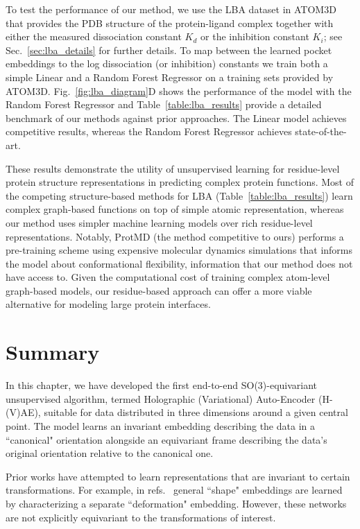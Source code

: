 To test the performance of our method, we use the LBA dataset in
ATOM3D~\cite{townshend_atom3d_2021} that provides the PDB structure of the protein-ligand complex
together with   either the measured dissociation constant $K_d$ or the inhibition constant $K_i$;
see Sec.~\ref{sec:lba_details} for further details. To map between the learned pocket embeddings to
the log dissociation (or inhibition) constants we train both a simple Linear and a Random Forest
Regressor on a training sets provided by ATOM3D.  Fig.~\ref{fig:lba_diagram}D shows the performance
of the model with the Random Forest Regressor and Table~\ref{table:lba_results} provide a detailed
benchmark of our methods against prior approaches.  The Linear model achieves competitive results,
whereas the Random Forest Regressor achieves state-of-the-art. 

These results demonstrate the utility of unsupervised learning for residue-level protein structure
representations in predicting complex protein functions. Most of the competing structure-based
methods for LBA (Table~\ref{table:lba_results}) learn complex graph-based functions on top of
simple atomic representation, whereas our method uses simpler machine learning models over rich
residue-level representations. Notably, ProtMD (the method competitive to ours) performs a
pre-training scheme using expensive molecular dynamics simulations that informs the model about
conformational flexibility, information that our method does not have access to. Given the
computational cost of training complex atom-level graph-based models, our residue-based approach
can offer a more viable alternative for modeling large protein interfaces.


\section{Summary}

In this chapter, we have developed the first end-to-end SO(3)-equivariant unsupervised algorithm, termed Holographic
(Variational) Auto-Encoder (H-(V)AE), suitable for data distributed in three dimensions around a given central point.
The model learns an invariant embedding describing the data in a ``canonical" orientation alongside an equivariant frame
describing the data's original orientation relative to the canonical one.

Prior works have attempted to learn representations that are invariant to certain transformations. For example, in
refs.~\cite{shu_deforming_2018, koneripalli_rate-invariant_2020} general ``shape" embeddings are learned by
characterizing a separate ``deformation" embedding. However, these networks are not explicitly equivariant to the
transformations of interest.

